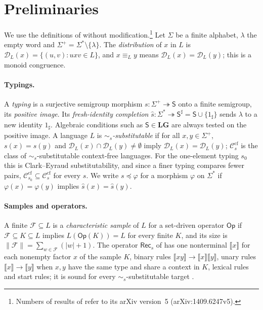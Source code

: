 \documentclass[11pt]{article}
\numberwithin{equation}{section}
\theoremstyle{plain}
\theoremstyle{definition}
\theoremstyle{remark}
\theoremstyle{plain}
\newcommand{\cf}{\mathrm{cf}}
\newcommand{\Ccf}[1]{\mathcal C_{#1}^{\cf}}
\newcommand{\Rec}{\mathsf{Rec}}
\newcommand{\NT}[1]{\llbracket #1\rrbracket}
\newcommand{\D}{\mathcal{D}}
\newcommand{\LG}{\mathbf{LG}}
\begin{document}
\section{Preliminaries}
\label{sec:prelim}
We use the definitions of \cite{kuriyamaCFG} without
modification.\footnote{Numbers of results of \cite{kuriyamaCFG} refer to its
arXiv version~5 (arXiv:1409.6247v5).}  Let $\Sigma$ be a finite alphabet,
$\lambda$ the empty word and $\Sigma^+=\Sigma^*\setminus\{\lambda\}$.  The
\emph{distribution} of $x$ in $L$ is $\D_L(x)=\{(u,v):uxv\in L\}$, and
$x\equiv_L y$ means $\D_L(x)=\D_L(y)$; this is a monoid congruence.

\paragraph{Typings.}
A \emph{typing} is a surjective semigroup morphism
$s:\Sigma^+\twoheadrightarrow\mathsf S$ onto a finite semigroup, its
\emph{positive image}.  Its \emph{fresh-identity completion}
$\widehat s:\Sigma^*\twoheadrightarrow\mathsf S^\sharp=\mathsf S\cup\{1_\sharp\}$
sends $\lambda$ to a new identity $1_\sharp$.
Algebraic conditions such as $\mathsf S\in\LG$ are always tested on the positive
image.  A language $L$ is \emph{$\sim_s$-substitutable} if for all
$x,y\in\Sigma^+$, $s(x)=s(y)$ and $\D_L(x)\cap\D_L(y)\ne\emptyset$ imply
$\D_L(x)=\D_L(y)$; $\Ccf{s}$ is the class of
$\sim_s$-substitutable context-free languages.  For the one-element typing
$s_0$ this is Clark--Eyraud substitutability, and since a finer typing
compares fewer pairs, $\Ccf{s_0}\subseteq\Ccf{s}$ for every $s$.  We write
$s\preceq\varphi$ for a morphism $\varphi$ on $\Sigma^*$ if $\varphi(x)=\varphi(y)$
implies $\widehat s(x)=\widehat s(y)$.

\paragraph{Samples and operators.}
A finite $\mathcal F\subseteq L$ is a \emph{characteristic sample} of $L$ for a
set-driven operator $\mathsf{Op}$ if $\mathcal F\subseteq K\subseteq L$ implies
$L(\mathsf{Op}(K))=L$ for every finite $K$, and its size is
$\|\mathcal F\|=\sum_{w\in\mathcal F}(|w|+1)$.
The operator $\Rec_s$ of \cite[Section~4.1]{kuriyamaCFG} has one nonterminal
$\NT{x}$ for each nonempty factor $x$ of the sample $K$, binary rules
$\NT{xy}\to\NT{x}\NT{y}$, unary rules $\NT{x}\to\NT{y}$ when $x,y$ have the
same type and share a context in $K$, lexical rules and start rules; it is
sound for every $\sim_s$-substitutable target \cite[Theorem~4.2]{kuriyamaCFG}.
\end{document}
